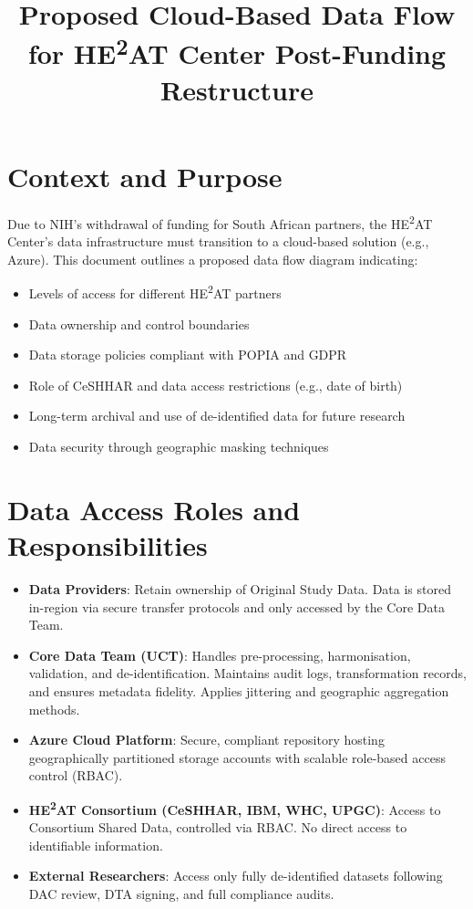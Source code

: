 \documentclass{article}
\title{Proposed Cloud-Based Data Flow for HE\textsuperscript{2}AT Center Post-Funding Restructure}
\author{}
\date{}
\begin{document}
\maketitle

\section*{Context and Purpose}
Due to NIH's withdrawal of funding for South African partners, the HE\textsuperscript{2}AT Center's data infrastructure must transition to a cloud-based solution (e.g., Azure). This document outlines a proposed data flow diagram indicating:
\begin{itemize}
    \item Levels of access for different HE\textsuperscript{2}AT partners
    \item Data ownership and control boundaries
    \item Data storage policies compliant with POPIA and GDPR
    \item Role of CeSHHAR and data access restrictions (e.g., date of birth)
    \item Long-term archival and use of de-identified data for future research
    \item Data security through geographic masking techniques
\end{itemize}

\section*{Data Access Roles and Responsibilities}
\begin{itemize}
    \item \textbf{Data Providers}: Retain ownership of Original Study Data. Data is stored in-region via secure transfer protocols and only accessed by the Core Data Team.
    \item \textbf{Core Data Team (UCT)}: Handles pre-processing, harmonisation, validation, and de-identification. Maintains audit logs, transformation records, and ensures metadata fidelity. Applies jittering and geographic aggregation methods.
    \item \textbf{Azure Cloud Platform}: Secure, compliant repository hosting geographically partitioned storage accounts with scalable role-based access control (RBAC).
    \item \textbf{HE\textsuperscript{2}AT Consortium (CeSHHAR, IBM, WHC, UPGC)}: Access to Consortium Shared Data, controlled via RBAC. No direct access to identifiable information.
    \item \textbf{External Researchers}: Access only fully de-identified datasets following DAC review, DTA signing, and full compliance audits.
\end{itemize}
\end{document}

